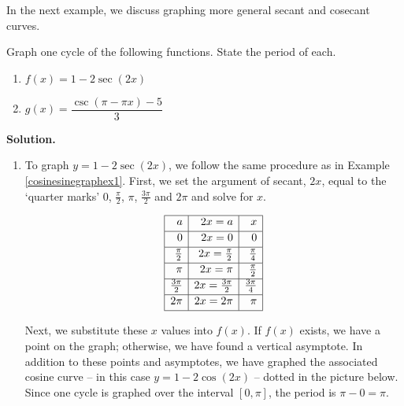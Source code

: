 \medskip

In the next example, we discuss graphing more general secant and cosecant curves.

\begin{ex}  \label{seccscgraphex} Graph one cycle of the following functions.  State the period of each.

\begin{multicols}{2}

\begin{enumerate}

\item  $f(x) = 1 - 2 \sec(2x)$

\item  $g(x) = \dfrac{\csc(\pi - \pi x) - 5}{3}$

\end{enumerate}

\end{multicols}

{\bf Solution.}  

\begin{enumerate}

\item  To graph $y = 1 - 2 \sec(2x)$, we follow the same procedure as in Example \ref{cosinesinegraphex1}.  First, we set the argument of secant, $2x$, equal to the `quarter marks' $0$, $\frac{\pi}{2}$, $\pi$, $\frac{3\pi}{2}$ and $2\pi$ and solve for $x$.

\setlength{\extrarowheight}{2pt}
\[ \begin{array}{|r|r|r|}  

\hline

 a & 2x = a & x \\ [2pt] \hline
0  & 2x = 0 & 0 \\ [2pt]   \hline

\frac{\pi}{2}  & 2x = \frac{\pi}{2} & \frac{\pi}{4} \\ [2pt] \hline 

\pi &  2x = \pi & \frac{\pi}{2} \\ [2pt] \hline 

\frac{3\pi}{2}  &  2x = \frac{3\pi}{2} & \frac{3\pi}{4} \\ [2pt] \hline 

2\pi  & 2x = 2\pi & \pi \\  [2pt] \hline
\end{array} \]
\setlength{\extrarowheight}{0pt}

Next, we substitute these $x$ values into $f(x)$.  If $f(x)$ exists, we have a point on the graph;  otherwise, we have found a vertical asymptote.  In addition to these points and asymptotes, we have graphed the associated cosine curve -- in this case $y = 1 - 2 \cos(2x)$ -- dotted in the picture below.  Since one cycle is graphed over the interval $[0,\pi]$, the period is $\pi - 0 = \pi$.
 


\end{enumerate}
\end{ex}
